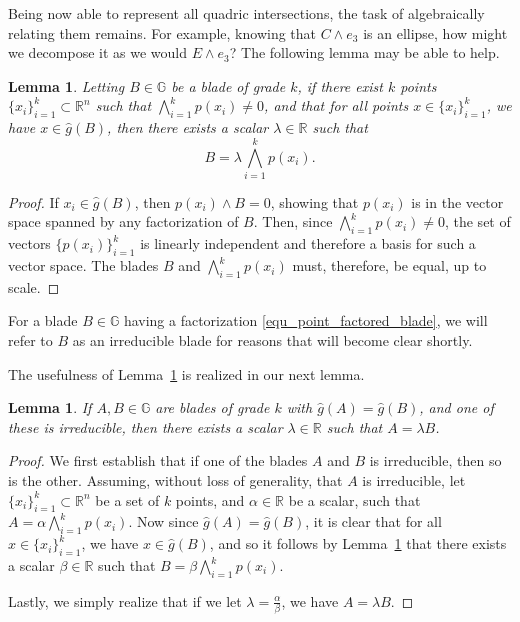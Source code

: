 \documentclass{birkjour}
\newtheorem{lem}[thm]{Lemma}
\theoremstyle{definition}
\theoremstyle{remark}
\numberwithin{equation}{section}
\newcommand{\R}{\mathbb{R}}
\newcommand{\G}{\mathbb{G}}
\newcommand{\gh}{\hat{g}}
\begin{document}
Being now able to represent all quadric intersections, the task of
algebraically relating them remains.  For example, knowing that
$C\wedge e_3$ is an ellipse, how might we decompose it
as we would $E\wedge e_3$?  The following lemma may be able to help.
\begin{lem}\label{lma_point_factored_blade}
Letting $B\in\G$ be a blade of grade $k$, if there exist $k$ points $\{x_i\}_{i=1}^k\subset\R^n$
such that $\bigwedge_{i=1}^k p(x_i)\neq 0$, and that for all points
$x\in\{x_i\}_{i=1}^k$, we have $x\in\gh(B)$, then there exists a scalar $\lambda\in\R$
such that
\begin{equation}\label{equ_point_factored_blade}
B = \lambda\bigwedge_{i=1}^k p(x_i).
\end{equation}
\end{lem}
\begin{proof}
If $x_i\in\gh(B)$, then $p(x_i)\wedge B=0$, showing that $p(x_i)$ is in the vector
space spanned by any factorization of $B$.  Then, since $\bigwedge_{i=1}^k p(x_i)\neq 0$,
the set of vectors $\{p(x_i)\}_{i=1}^k$ is linearly independent and therefore
a basis for such a vector space.  The blades $B$ and $\bigwedge_{i=1}^k p(x_i)$
must, therefore, be equal, up to scale.
\end{proof}
For a blade $B\in\G$ having a factorization \eqref{equ_point_factored_blade},
we will refer to $B$ as an irreducible blade for reasons that will become clear shortly.

The usefulness of Lemma~\ref{lma_point_factored_blade} is realized in our next lemma.
\begin{lem}\label{lma_equating_blades}
If $A,B\in\G$ are blades of grade $k$ with $\gh(A)=\gh(B)$, and one of these is irreducible,
then there exists a scalar $\lambda\in\R$ such that $A=\lambda B$.
\end{lem}
\begin{proof}
We first establish that if one of the blades $A$ and $B$ is irreducible, then so is the other.
Assuming, without loss of generality, that $A$ is irreducible, let $\{x_i\}_{i=1}^k\subset\R^n$
be a set of $k$ points, and $\alpha\in\R$ be a scalar, such that $A=\alpha\bigwedge_{i=1}^k p(x_i)$.
Now since $\gh(A)=\gh(B)$, it is clear that for all $x\in\{x_i\}_{i=1}^k$, we have $x\in\gh(B)$,
and so it follows by Lemma~\ref{lma_point_factored_blade} that there exists a scalar $\beta\in\R$
such that $B=\beta\bigwedge_{i=1}^k p(x_i)$.

Lastly, we simply realize that if we let $\lambda=\frac{\alpha}{\beta}$, we have
$A=\lambda B$.
\end{proof}
\end{document}
